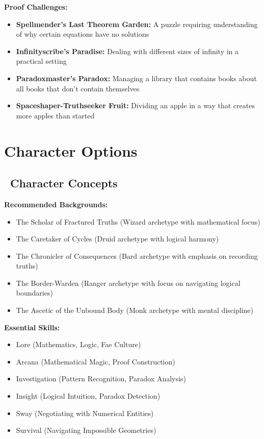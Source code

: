 \documentclass[11pt]{article}
\begin{document}
\textbf{Proof Challenges:}
\begin{itemize}
    \item \textbf{Spellmender's Last Theorem Garden:} A puzzle requiring understanding of why certain equations have no solutions
    \item \textbf{Infinityscribe's Paradise:} Dealing with different sizes of infinity in a practical setting
    \item \textbf{Paradoxmaster's Paradox:} Managing a library that contains books about all books that don't contain themselves
    \item \textbf{Spaceshaper-Truthseeker Fruit:} Dividing an apple in a way that creates more apples than started
\end{itemize}

\section{Character Options}

\subsection*{\faUser\ Character Concepts}

\textbf{Recommended Backgrounds:}
\begin{itemize}
    \item The Scholar of Fractured Truths (Wizard archetype with mathematical focus)
    \item The Caretaker of Cycles (Druid archetype with logical harmony)
    \item The Chronicler of Consequences (Bard archetype with emphasis on recording truths)
    \item The Border-Warden (Ranger archetype with focus on navigating logical boundaries)
    \item The Ascetic of the Unbound Body (Monk archetype with mental discipline)
\end{itemize}

\textbf{Essential Skills:}
\begin{itemize}
    \item Lore (Mathematics, Logic, Fae Culture)
    \item Arcana (Mathematical Magic, Proof Construction)
    \item Investigation (Pattern Recognition, Paradox Analysis)
    \item Insight (Logical Intuition, Paradox Detection)
    \item Sway (Negotiating with Numerical Entities)
    \item Survival (Navigating Impossible Geometries)
\end{itemize}
\end{document}
